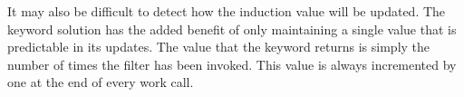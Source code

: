 
It may also be difficult to detect how the induction value will be
updated. The keyword solution has the added benefit of only maintaining
a single value that is predictable in its updates. The value that the 
keyword returns is simply the number of times the filter has been 
invoked. This value is always incremented by one at the end of every work call.

